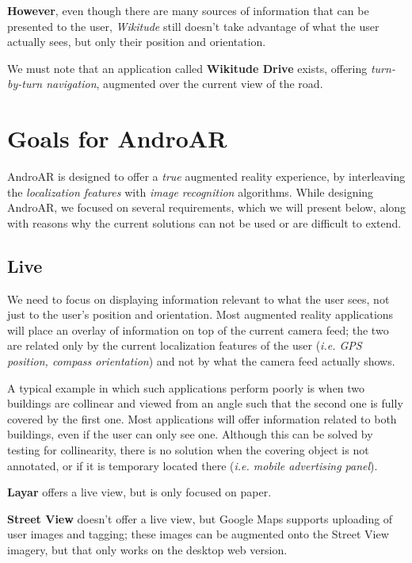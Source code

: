 \documentclass[a4paper,onecolumn,oneside,titlepage,11pt]{report}
\begin{document}
\textbf{However}, even though there are many sources of information that can be presented to the user, \emph{Wikitude} still doesn't take advantage of what the user actually sees, but only their position and orientation.

We must note that an application called \textbf{Wikitude Drive} exists, offering \emph{turn-by-turn navigation}, augmented over the current view of the road.

\chapter{Goals for AndroAR}
\label{chap:goals}
AndroAR is designed to offer a \emph{true} augmented reality experience, by interleaving the \emph{localization features} with \emph{image recognition} algorithms. While designing AndroAR, we focused on several requirements, which we will present below, along with reasons why the current solutions can not be used or are difficult to extend.
\section*{Live}
We need to focus on displaying information relevant to what the user sees, not just to the user's position and orientation. Most augmented reality applications will place an overlay of information on top of the current camera feed; the two are related only by the current localization features of the user (\emph{i.e. GPS position, compass orientation}) and not by what the camera feed actually shows.

A typical example in which such applications perform poorly is when two buildings are collinear and viewed from an angle such that the second one is fully covered by the first one. Most applications will offer information related to both buildings, even if the user can only see one. Although this can be solved by testing for collinearity, there is no solution when the covering object is not annotated, or if it is temporary located there (\emph{i.e. mobile advertising panel}).

\textbf{Layar} offers a live view, but is only focused on paper.

\textbf{Street View} doesn't offer a live view, but Google Maps supports uploading of user images and tagging; these images can be augmented onto the Street View imagery, but that only works on the desktop web version.
\end{document}
